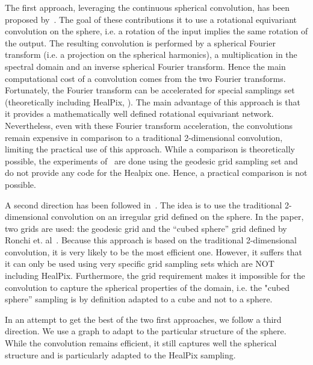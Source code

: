 \documentclass[final,twocolumn,3p,times,authoryear]{elsarticle}
\newcommand{\nati}[1]{{\color[rgb]{.1,.6,.1}{#1}}}
\newcommand{\1}{\b{1}}              %
\newcommand{\0}{\b{0}}              %
\begin{document}
The first approach, leveraging the continuous spherical convolution, has been
proposed by~\cite{cohen2017convolutional,cohen2018spherical}. The goal of these
contributions it to use a rotational equivariant convolution on the
sphere, i.e. a rotation of the input implies the same rotation of the output.
The resulting convolution is performed by a spherical Fourier transform (i.e. a projection
on the spherical harmonics), a  multiplication in the spectral domain and an
inverse spherical Fourier transform. Hence the main computational cost of a
convolution comes from the two Fourier transforms. Fortunately, the Fourier
transform can be accelerated for special samplings set (theoretically including
HealPix, \cite{...}). The main advantage of this approach is that it provides a
mathematically well defined rotational equivariant network. Nevertheless, even
with these Fourier transform acceleration, the convolutions remain expensive in
comparison to a traditional 2-dimensional convolution, limiting the practical use of this
approach. While a comparison is theoretically possible, the experiments
of~\cite{cohen2018spherical} are done using the geodesic grid sampling set and
do not provide any code for the Healpix one. Hence, a practical comparison is
not possible.

A second direction has been followed in~\cite{boomsma2017spherical}. The idea is
to use the traditional 2-dimensional convolution on an irregular grid defined on the
sphere. In the paper, two grids are used: the geodesic grid and the “cubed
sphere” grid defined by Ronchi et. al~\cite{ronchi1996cubed}. Because this
approach is based on the traditional 2-dimensional convolution, it is very likely to be the
most efficient one. However, it suffers that it can only be used using very
specific grid sampling sets which are NOT including HealPix. Furthermore, the
grid requirement makes it impossible for the convolution to capture the
spherical properties of the domain, i.e. the "cubed sphere” sampling is by
definition adapted to a cube and not to a sphere.

In an attempt to get the best of the two first approaches, we follow a third
direction. We use a graph to adapt to the particular structure of the sphere.
While the convolution remains efficient, it still captures well the spherical
structure and is particularly adapted to the HealPix sampling.
\end{document}
